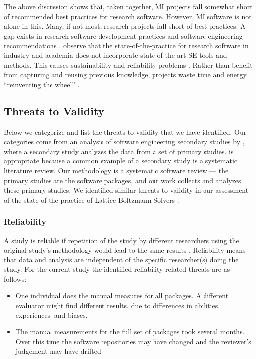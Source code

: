 \documentclass[11pt]{article}
\begin{document}
The above discussion shows that, taken together, MI projects fall somewhat short
of recommended best practices for research software.  However, MI software is
not alone in this.  Many, if not most, research projects fall short of best
practices.  A gap exists in research software development practices and software
engineering recommendations \citep{Storer2017, Kelly2007, OwojaiyeEtAl2021_CSE}.
\citet{JohansonAndHasselbring2018} observe that the state-of-the-practice for
research software in industry and academia does not incorporate state-of-the-art
SE tools and methods.  This causes sustainability and reliability problems
\citep{FaulkEtAl2009}. Rather than benefit from capturing and reusing previous
knowledge, projects waste time and energy ``reinventing the wheel''
\citep{deSouzaEtAl2019}.

\subsection{Threats to Validity} \label{sec_threats_to_validity}

Below we categorize and list the threats to validity that we have identified.
Our categories come from an analysis of software engineering secondary studies
by \citet{AmpatzoglouEtAl2019}, where a secondary study analyzes the data from a
set of primary studies.  \citet{AmpatzoglouEtAl2019} is appropriate because a
common example of a secondary study is a systematic literature review. Our
methodology is a systematic software review --- the primary studies are the
software packages, and our work collects and analyzes these primary studies.  We
identified similar threats to validity in our assessment of the state of the
practice of Lattice Boltzmann Solvers \citep{SmithEtAl2024}.

\subsubsection{Reliability}

A study is reliable if repetition of the study by different researchers using
the original study's methodology would lead to the same results
\citep{RunesonAndHost2009}. Reliability means that data and analysis are
independent of the specific researcher(s) doing the study.  For the current
study the identified reliability related threats are as follows:

\begin{itemize}
\item One individual does the manual measures for all packages. A different
evaluator might find different results, due to differences in abilities,
experiences, and biases.
\item The manual measurements for the full set of packages took several months.
Over this time the software repositories may have changed and the reviewer's
judgement may have drifted.
\end{itemize}
\end{document}
